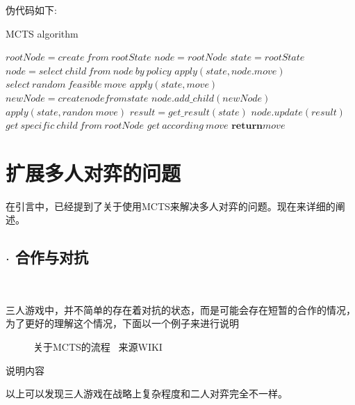 \documentclass[9pt,twocolumn,twoside]{osajnl}
\begin{document}
伪代码如下:
\begin{algorithm}
	\caption{MCTS algorithm}\label{alg:MCTS}
	\begin{algorithmic}[1]
		\State $rootNode = create \ from \ rootState $
		\State $node = rootNode$
		\State $state = rootState$
		\State $node = select \ child \ from \ node \ by \ policy$
		\State $apply(state,node.move)$ 
		\EndWhile
		\State $select \ random \ feasible \ move$
		\State $apply(state,move)$
		\State $newNode = create node from state$
		\State $node.add\_child(newNode)$ 
		\State $apply(state, randon \ move)$ 
		\EndWhile
		\State $result = get\_result(state)$
		\State $node.update(result)$
		\EndWhile
		\EndWhile
		\State $get \ specific \ child \ from \ rootNode$
		\State $get \ according \ move$
		\State $\textbf{return} move$
		\EndProcedure
	\end{algorithmic}
\end{algorithm}

\section{扩展多人对弈的问题}
在引言中，已经提到了关于使用MCTS来解决多人对弈的问题。现在来详细的阐述。
\subsection{$\cdot$ 合作与对抗}
\begin{adjustwidth}{2em}{}
	\ \ \ \ \
	
	三人游戏中，并不简单的存在着对抗的状态，而是可能会存在短暂的合作的情况，为了更好的理解这个情况，下面以一个例子来进行说明
	
	\begin{figure}[htbp]
		\centering
		\caption{关于MCTS的流程 \ 来源WIKI \cite{MCTSGraphWiki}}
		\label{fig:false-color}
	\end{figure}
	
	
	说明内容
	
	
	以上可以发现三人游戏在战略上复杂程度和二人对弈完全不一样。
	
\end{adjustwidth}
\end{document}
